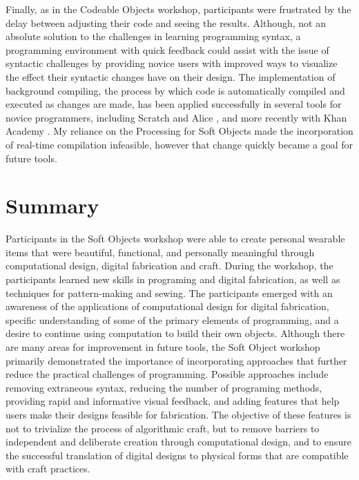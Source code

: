Finally, as in the Codeable Objects workshop, participants were frustrated by the delay between adjusting their code and seeing the results. Although, not an absolute solution to the challenges in learning programming syntax, a programming environment with quick feedback could assist with the issue of syntactic challenges by providing novice users with improved ways to visualize the effect their syntactic changes have on their design. The implementation of background compiling, the process by which code is automatically compiled and executed as changes are made, has been applied successfully in several tools for novice programmers, including Scratch and Alice \cite{alice}, and more recently with Khan Academy \cite{khan}. My reliance on the Processing for Soft Objects made the incorporation of real-time compilation infeasible, however that change quickly became a goal for future tools.

\section{Summary}
Participants in the Soft Objects workshop were able to create personal wearable items that were beautiful, functional, and personally meaningful through computational design, digital fabrication and craft. During the workshop, the participants learned new skills in programing and digital fabrication, as well as techniques for pattern-making and sewing. The participants emerged with an awareness of the applications of computational design for digital fabrication, specific understanding of some of the primary elements of programming, and a desire to continue using computation to build their own objects. Although there are many areas for improvement in future tools, the Soft Object workshop primarily demonstrated the importance of incorporating approaches that further reduce the practical challenges of programming. Possible approaches include removing extraneous syntax, reducing the number of programing methods, providing rapid and informative visual feedback, and adding features that help users make their designs feasible for fabrication. The objective of these features is not to trivialize the process of algorithmic craft, but to remove barriers to independent and deliberate creation through computational design, and to ensure the successful translation of digital designs to physical forms that are compatible with craft practices. 